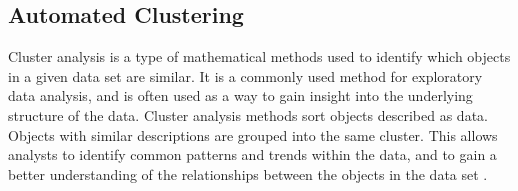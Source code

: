 \subsection{Automated Clustering}

Cluster analysis is a type of mathematical methods used to identify which
objects in a given data set are similar. It is a commonly used method for
exploratory data analysis, and is often used as a way to gain insight into
the underlying structure of the data. Cluster analysis methods sort
objects described as data. Objects with similar descriptions are grouped
into the same cluster. This allows analysts to identify common patterns
and trends within the data, and to gain a better understanding of the
relationships between the objects in the data set
\parencite{romesburg1984cluster}.



